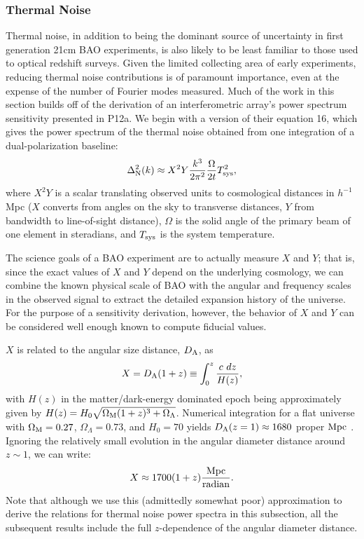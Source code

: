 \documentclass[10pt,iop]{emulateapj}
\begin{document}
\subsubsection{Thermal Noise}
\label{sec:thermal_noise}
Thermal noise, in addition to being the dominant source of uncertainty in first generation
21cm BAO experiments, is also likely to be
least familiar to those used to optical redshift surveys.
Given the limited collecting area of early experiments, reducing thermal noise
contributions is of paramount importance, even at the expense of the number of
Fourier modes measured.
Much of the work in this section builds off of the derivation of an interferometric array's
power spectrum sensitivity presented in P12a.  We begin with a version of their 
equation 16, which gives
the power spectrum of the thermal noise obtained from one integration of a
dual-polarization baseline:
\begin{equation}
\label{eq:single_baseline_sensitivity}
\Delta^2_{\rm N}(k) \approx X^2Y\frac{k^3}{2\pi^2}\frac{\Omega}{2t}T_{\rm sys}^2,
\end{equation}
where $X^2Y$ is a scalar translating observed units to cosmological distances in $h^{-1}$Mpc
($X$ converts from angles on the sky to transverse distances, $Y$ from bandwidth to
line-of-sight distance), $\Omega$ is the solid angle of the primary beam of one element
in steradians, and $T_{\rm sys}$ is the system temperature.

The science goals of a BAO experiment are to actually measure $X$ and $Y$; that is, since
the exact values of $X$ and $Y$ depend on the underlying cosmology, we can combine the
known physical scale of BAO with the angular and frequency scales in the observed signal to extract
the detailed expansion history of the universe.  For the purpose of a sensitivity derivation,
however, the behavior of $X$ and $Y$ can be considered well enough known to compute fiducial
values.

$X$ is related to the angular size distance, $D_{\rm A}$, as
\begin{equation}
\label{eq:X}
    X=D_{\rm A}(1+z)\equiv\int_0^z{\frac{c\ dz}{H(z)}},
\end{equation}
with $H(z)$ in the matter/dark-energy dominated epoch being approximately given by 
$H(z)=H_0\sqrt{\Omega_{\rm M}(1+z)^3+\Omega_\Lambda}$.  Numerical integration for a flat universe
with $\Omega_{\rm M}=0.27$, $\Omega_\Lambda=0.73$, and $H_0=70$ yields $D_{\rm A}(z=1)\approx1680$ 
proper $\rm{Mpc}$ \citep{wright2006}.  Ignoring the relatively small evolution in the 
angular diameter distance around $z\sim1$, we can write:
\begin{equation}
\label{eq:X_approx}
    X\approx 1700 (1+z) \frac{\rm Mpc}{\rm radian}.
\end{equation}
Note that although we use this (admittedly somewhat poor) approximation to derive the relations for thermal noise
power spectra in this subsection, all the subsequent results include the full $z$-dependence of the
angular diameter distance.
\end{document}
